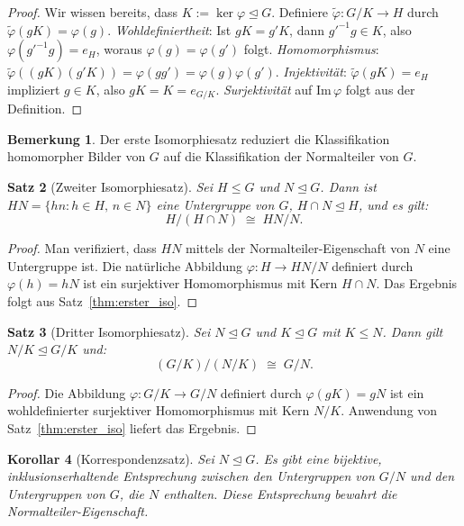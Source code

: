 \documentclass[12pt,a4paper]{amsart}
\newtheorem{theorem}{Satz}[section]
\newtheorem{corollary}[theorem]{Korollar}
\theoremstyle{definition}
\newtheorem{remark}[theorem]{Bemerkung}
\begin{document}
\begin{proof}
Wir wissen bereits, dass $K := \ker\varphi \trianglelefteq G$. Definiere
$\tilde\varphi : G/K \to H$ durch $\tilde\varphi(gK) = \varphi(g)$.
\textit{Wohldefiniertheit}: Ist $gK = g'K$, dann $g'^{-1}g \in K$, also
$\varphi(g'^{-1}g) = e_H$, woraus $\varphi(g) = \varphi(g')$ folgt.
\textit{Homomorphismus}: $\tilde\varphi((gK)(g'K)) = \varphi(gg') = \varphi(g)\varphi(g')$.
\textit{Injektivität}: $\tilde\varphi(gK) = e_H$ impliziert $g \in K$, also
$gK = K = e_{G/K}$.
\textit{Surjektivität} auf $\mathrm{Im}\,\varphi$ folgt aus der Definition.
\end{proof}

\begin{remark}
Der erste Isomorphiesatz reduziert die Klassifikation homomorpher Bilder von $G$ auf die
Klassifikation der Normalteiler von $G$.
\end{remark}

\begin{theorem}[Zweiter Isomorphiesatz]
\label{thm:zweiter_iso}
Sei $H \leq G$ und $N \trianglelefteq G$. Dann ist $HN = \{hn : h \in H,\, n \in N\}$
eine Untergruppe von $G$, $H \cap N \trianglelefteq H$, und es gilt:
\[
  H / (H \cap N) \;\cong\; HN / N.
\]
\end{theorem}

\begin{proof}
Man verifiziert, dass $HN$ mittels der Normalteiler-Eigenschaft von $N$ eine Untergruppe
ist. Die natürliche Abbildung $\varphi : H \to HN/N$ definiert durch $\varphi(h) = hN$ ist
ein surjektiver Homomorphismus mit Kern $H \cap N$. Das Ergebnis folgt aus
Satz~\ref{thm:erster_iso}.
\end{proof}

\begin{theorem}[Dritter Isomorphiesatz]
\label{thm:dritter_iso}
Sei $N \trianglelefteq G$ und $K \trianglelefteq G$ mit $K \leq N$. Dann gilt
$N/K \trianglelefteq G/K$ und:
\[
  (G/K) / (N/K) \;\cong\; G/N.
\]
\end{theorem}

\begin{proof}
Die Abbildung $\varphi : G/K \to G/N$ definiert durch $\varphi(gK) = gN$ ist ein
wohldefinierter surjektiver Homomorphismus mit Kern $N/K$. Anwendung von
Satz~\ref{thm:erster_iso} liefert das Ergebnis.
\end{proof}

\begin{corollary}[Korrespondenzsatz]
Sei $N \trianglelefteq G$. Es gibt eine bijektive, inklusionserhaltende Entsprechung
zwischen den Untergruppen von $G/N$ und den Untergruppen von $G$, die $N$ enthalten.
Diese Entsprechung bewahrt die Normalteiler-Eigenschaft.
\end{corollary}
\end{document}

